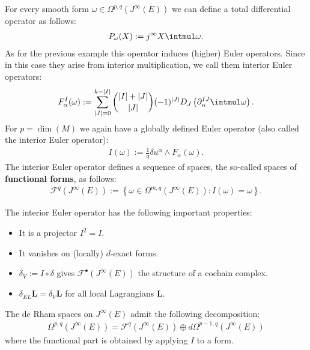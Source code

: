     \begin{example}
        For every smooth form $\omega\in\Omega^{p,q}(J^\infty(E))$ we can define a total differential operator as follows:
        \begin{gather}
            P_\omega(X) := j^\infty X\intmul\omega.
        \end{gather}
        As for the previous example this operator induces (higher) Euler operators. Since in this case they arise from interior multiplication, we call them interior Euler operators:
        \begin{gather}
            \label{var:interior_euler_operators}
            F^I_\alpha(\omega) := \sum_{|J|=0}^{k-|I|}\binom{|I|+|J|}{|J|}(-1)^{|J|}D_J\left(\partial^{IJ}_\alpha\intmul\omega\right).
        \end{gather}
        For $p=\dim(M)$ we again have a globally defined Euler operator (also called the interior Euler operator):
        \begin{gather}
            I(\omega) := \frac{1}{q}\delta u^\alpha\wedge F_\alpha(\omega).
        \end{gather}
        The interior Euler operator defines a sequence of spaces, the so-called spaces of \textbf{functional forms}, as follows:
        \begin{gather}
            \mathcal{F}^q(J^\infty(E)) := \left\{\omega\in\Omega^{m,q}(J^\infty(E)):I(\omega)=\omega\right\}.
        \end{gather}
    \end{example}
    \begin{property}
        The interior Euler operator has the following important properties:
        \begin{itemize}
            \item It is a projector $I^2=I$.
            \item It vanishes on (locally) $d$-exact forms.
            \item $\delta_V := I\circ\delta$ gives $\mathcal{F}^\bullet(J^\infty(E))$ the structure of a cochain complex.
            \item $\delta_{EL}\mathbf{L} = \delta_V\mathbf{L}$ for all local Lagrangians $\mathbf{L}$.
        \end{itemize}
    \end{property}
    \begin{property}\label{var:functional_decomposition}
        The de Rham spaces on $J^\infty(E)$ admit the following decomposition:
        \begin{gather}
            \Omega^{p,q}(J^\infty(E)) = \mathcal{F}^q(J^\infty(E))\oplus d\Omega^{p-1,q}(J^\infty(E))
        \end{gather}
        where the functional part is obtained by applying $I$ to a form.
    \end{property}

